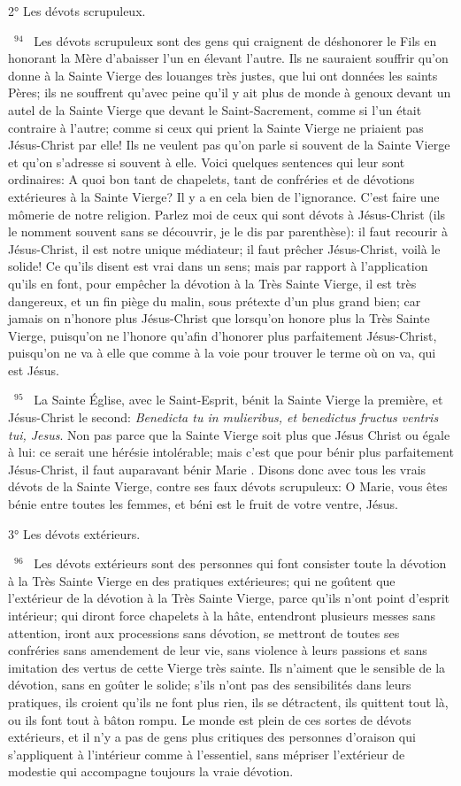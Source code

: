 \documentclass[paper=a5,pagesize=pdftex,fontsize=15pt,headinclude=on,twoside=off]{scrbook}
\newcommand{\negphantom}[1]{\settowidth{\dimen0}{#1}\hspace*{-\dimen0}}
\newcommand{\versenb}[1]{\par \vspace{10pt}~\negphantom{~${}^{#1}$~}${}^{#1}$~}
\newcommand{\latin}[1]{\emph{#1}}
\begin{document}
2° Les dévots scrupuleux.
\versenb{94} Les dévots scrupuleux sont des gens qui craignent de déshonorer le Fils en honorant la Mère d'abaisser l'un
en élevant l'autre. Ils ne sauraient souffrir qu'on donne à la Sainte Vierge des louanges très justes, que lui ont
données les saints Pères; ils ne souffrent qu'avec peine qu'il y ait plus de monde à genoux devant un autel de la
Sainte Vierge que devant le Saint-Sacrement, comme si l'un était contraire à l'autre; comme si ceux qui prient la
Sainte Vierge ne priaient pas Jésus-Christ par elle! Ils ne veulent pas qu'on parle si souvent de la Sainte Vierge et
qu'on s'adresse si souvent à elle.
Voici quelques sentences qui leur sont ordinaires: A quoi bon tant de chapelets, tant de confréries et de dévotions
extérieures à la Sainte Vierge? Il y a en cela bien de l'ignorance. C'est faire une mômerie de notre religion. Parlez moi de ceux qui sont dévots à Jésus-Christ (ils le nomment souvent sans se découvrir, je le dis par parenthèse): il
faut recourir à Jésus-Christ, il est notre unique médiateur; il faut prêcher Jésus-Christ, voilà le solide!
Ce qu'ils disent est vrai dans un sens; mais par rapport à l'application qu'ils en font, pour empêcher la dévotion à la
Très Sainte Vierge, il est très dangereux, et un fin piège du malin, sous prétexte d'un plus grand bien; car jamais
on n'honore plus Jésus-Christ que lorsqu'on honore plus la Très Sainte Vierge, puisqu'on ne l'honore qu'afin
d'honorer plus parfaitement Jésus-Christ, puisqu'on ne va à elle que comme à la voie pour trouver le terme où on
va, qui est Jésus.
\versenb{95} La Sainte Église, avec le Saint-Esprit, bénit la Sainte Vierge la première, et Jésus-Christ le second: \latin{Benedicta tu in mulieribus, et benedictus fructus ventris tui, Jesus}. Non pas parce que la Sainte Vierge soit plus que Jésus
Christ ou égale à lui: ce serait une hérésie intolérable; mais c'est que pour bénir plus parfaitement Jésus-Christ, il
faut auparavant bénir Marie . Disons donc avec tous les vrais dévots de la Sainte Vierge, contre ses faux dévots
scrupuleux: O Marie, vous êtes bénie entre toutes les femmes, et béni est le fruit de votre ventre, Jésus.

3° Les dévots extérieurs.
\versenb{96} Les dévots extérieurs sont des personnes qui font consister toute la dévotion à la Très Sainte Vierge en des
pratiques extérieures; qui ne goûtent que l'extérieur de la dévotion à la Très Sainte Vierge, parce qu'ils n'ont point
d'esprit intérieur; qui diront force chapelets à la hâte, entendront plusieurs messes sans attention, iront aux
processions sans dévotion, se mettront de toutes ses confréries sans amendement de leur vie, sans violence à
leurs passions et sans imitation des vertus de cette Vierge très sainte. Ils n'aiment que le sensible de la dévotion,
sans en goûter le solide; s'ils n'ont pas des sensibilités dans leurs pratiques, ils croient qu'ils ne font plus rien, ils
se détractent, ils quittent tout là, ou ils font tout à bâton rompu. Le monde est plein de ces sortes de dévots
extérieurs, et il n'y a pas de gens plus critiques des personnes d'oraison qui s'appliquent à l'intérieur comme à
l'essentiel, sans mépriser l'extérieur de modestie qui accompagne toujours la vraie dévotion.
\end{document}
